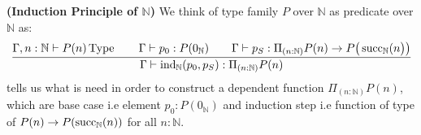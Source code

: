 \begin{definition}\textbf{(Induction Principle of $\mathbb{N}$)}
    We think of type family $P$ over $\mathbb{N}$ as predicate over $\mathbb{N}$ as:
    \begin{equation*}
        \cfrac{\Gamma,n:\mathbb{N}\vdash P(n)\operatorname{Type}\qquad\Gamma\vdash p_0:P(0_\mathbb{N})\qquad\Gamma\vdash p_S:\Pi_{(n:\mathbb{N})}P(n)\rightarrow P\big(\operatorname{succ}_\mathbb{N}(n\big)\big)}{\Gamma\vdash\operatorname{ind}_\mathbb{N}(p_0,p_S):\Pi_{(n:\mathbb{N})}P(n)}
    \end{equation*}
    tells us what is need in order to construct a dependent function $\Pi_{(n:\mathbb{N})}P(n)$, which are base case i.e element $p_0:P(0_\mathbb{N})$ and induction step i.e function of type of $P(n)\rightarrow P(\operatorname{succ}_\mathbb{N}(n))$ for all $n:\mathbb{N}$.
\end{definition}

